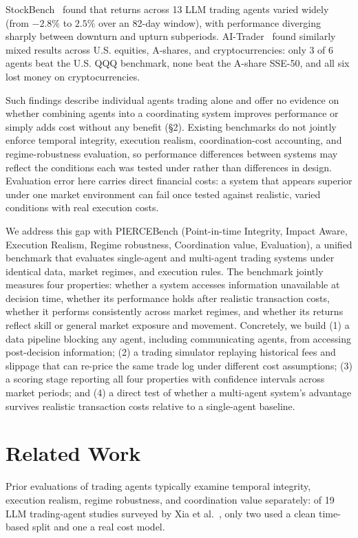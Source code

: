 \documentclass{article}
\begin{document}
StockBench~\cite{chen2025stockbench} found that returns across 13 LLM trading agents varied widely (from $-2.8\%$ to $2.5\%$ over an 82-day window), with performance diverging sharply between downturn and upturn subperiods. AI-Trader~\cite{fan2025aitrader} found similarly mixed results across U.S. equities, A-shares, and cryptocurrencies: only 3 of 6 agents beat the U.S. QQQ benchmark, none beat the A-share SSE-50, and all six lost money on cryptocurrencies.

Such findings describe individual agents trading alone and offer no evidence on whether combining agents into a coordinating system improves performance or simply adds cost without any benefit (\S2). Existing benchmarks do not jointly enforce temporal integrity, execution realism, coordination-cost accounting, and regime-robustness evaluation, so performance differences between systems may reflect the conditions each was tested under rather than differences in design. Evaluation error here carries direct financial costs: a system that appears superior under one market environment can fail once tested against realistic, varied conditions with real execution costs.

We address this gap with PIERCEBench (Point-in-time Integrity, Impact Aware, Execution Realism, Regime robustness, Coordination value, Evaluation), a unified benchmark that evaluates single-agent and multi-agent trading systems under identical data, market regimes, and execution rules. The benchmark jointly measures four properties: whether a system accesses information unavailable at decision time, whether its performance holds after realistic transaction costs, whether it performs consistently across market regimes, and whether its returns reflect skill or general market exposure and movement. Concretely, we build (1) a data pipeline blocking any agent, including communicating agents, from accessing post-decision information; (2) a trading simulator replaying historical fees and slippage that can re-price the same trade log under different cost assumptions; (3) a scoring stage reporting all four properties with confidence intervals across market periods; and (4) a direct test of whether a multi-agent system's advantage survives realistic transaction costs relative to a single-agent baseline.

\section{Related Work}

Prior evaluations of trading agents typically examine temporal integrity, execution realism, regime robustness, and coordination value separately: of 19 LLM trading-agent studies surveyed by Xia et al.~\cite{xia2026}, only two used a clean time-based split and one a real cost model.
\end{document}
